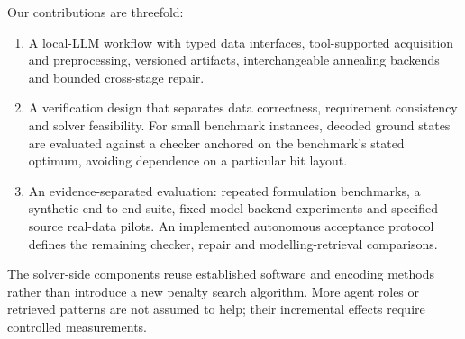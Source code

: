Our contributions are threefold:
\begin{enumerate}
  \item A local-LLM workflow with typed data interfaces, tool-supported acquisition and preprocessing,
        versioned artifacts, interchangeable annealing backends and bounded cross-stage repair.
  \item A verification design that separates data correctness, requirement consistency and solver feasibility.
        For small benchmark instances, decoded ground states are evaluated against a checker anchored on the
        benchmark's stated optimum, avoiding dependence on a particular bit layout.
  \item An evidence-separated evaluation: repeated formulation benchmarks, a synthetic end-to-end suite,
        fixed-model backend experiments and specified-source real-data pilots. An implemented autonomous
        acceptance protocol defines the remaining checker, repair and modelling-retrieval comparisons.
\end{enumerate}
The solver-side components reuse established software and encoding methods rather than introduce a new penalty
search algorithm. More agent roles or retrieved patterns are not assumed to help; their incremental effects
require controlled measurements.
